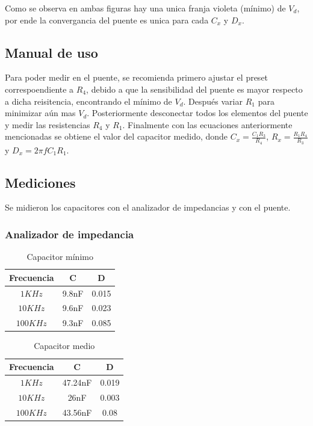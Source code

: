 \documentclass[../../main.tex]{subfiles}
\begin{document}
Como se observa en ambas figuras hay una unica franja violeta (m\'inimo) de $V_d$, por ende la convergancia del puente es unica para cada $C_x$ y $D_x$.

\subsection{Manual de uso}
Para poder medir en el puente, se recomienda primero ajustar el preset correspoendiente a $R_4$, debido a que la sensibilidad del puente es mayor respecto a dicha reisitencia, encontrando el m\'inimo de $V_d$. Despu\'es variar $R_1$ para minimizar a\'un mas $V_d$. Posteriormente desconectar todos los elementos del puente y medir las resistencias $R_4$ y $R_1$. Finalmente con las ecuaciones anteriormente mencionadas se obtiene el valor del capacitor medido, donde $C_x=\frac{C_1 R_3}{R_4}$, $R_x=\frac{R_1 R_4}{R_3}$ y $D_x=2 \pi f C_1 R_1$.

\subsection{Mediciones}
Se midieron los capacitores con el analizador de impedancias y con el puente.

\subsubsection{Analizador de impedancia}

\begin{table}[H]
\begin{center}
\begin{tabular}{|c|c|c|}
\hline
 Frecuencia&C&D\\
\hline \hline

$ 1KHz$ &9.8nF&0.015  \\ \hline
$ 10KHz$  & 9.6nF&0.023  \\ \hline
$ 100KHz$  &9.3nF &0.085  \\ \hline

\end{tabular}
\caption{Capacitor m\'inimo } 
\end{center}
\end{table}
\begin{table}[H]
\begin{center}
\begin{tabular}{|c|c|c|}
\hline
 Frecuencia&C&D\\
\hline \hline

$ 1KHz$ &47.24nF&0.019  \\ \hline
$ 10KHz$  & 26nF&0.003 \\ \hline
$ 100KHz$  &43.56nF &0.08  \\ \hline

\end{tabular}
\caption{Capacitor medio} 
\end{center}
\end{table}
\end{document}
